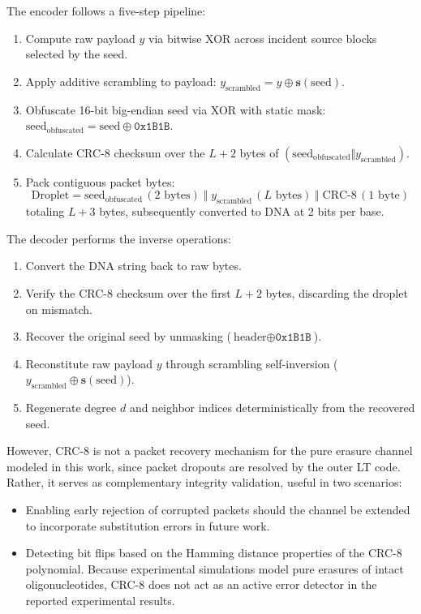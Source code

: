 The encoder follows a five-step pipeline:
\begin{enumerate}
    \item Compute raw payload $y$ via bitwise XOR across incident source blocks selected by the seed.
    \item Apply additive scrambling to payload: $y_{\text{scrambled}} = y \oplus \mathbf{s}(\text{seed})$.
    \item Obfuscate 16-bit big-endian seed via XOR with static mask: $\text{seed}_{\text{obfuscated}} = \text{seed} \oplus \texttt{0x1B1B}$.
    \item Calculate CRC-8 checksum over the $L + 2$ bytes of $(\text{seed}_{\text{obfuscated}} \Vert y_{\text{scrambled}})$.
    \item Pack contiguous packet bytes:
    \begin{equation}
        \text{Droplet} = \text{seed}_{\text{obfuscated}} \,(2\text{ bytes}) \;\Vert\; y_{\text{scrambled}} \,(L\text{ bytes}) \;\Vert\; \text{CRC-8} \,(1\text{ byte})
    \end{equation}
    totaling $L + 3$ bytes, subsequently converted to DNA at 2 bits per base.
\end{enumerate}

The decoder performs the inverse operations:
\begin{enumerate}
    \item Convert the DNA string back to raw bytes.
    \item Verify the CRC-8 checksum over the first $L + 2$ bytes, discarding the droplet on mismatch.
    \item Recover the original seed by unmasking ($\text{header} \oplus \texttt{0x1B1B}$).
    \item Reconstitute raw payload $y$ through scrambling self-inversion ($y_{\text{scrambled}} \oplus \mathbf{s}(\text{seed})$).
    \item Regenerate degree $d$ and neighbor indices deterministically from the recovered seed.
\end{enumerate}

However, CRC-8 is not a packet recovery mechanism for the pure erasure channel modeled in this work, since packet dropouts are resolved by the outer LT code. Rather, it serves as complementary integrity validation, useful in two scenarios:
\begin{itemize}
    \item Enabling early rejection of corrupted packets should the channel be extended to incorporate substitution errors in future work.
    \item Detecting bit flips based on the Hamming distance properties of the CRC-8 polynomial. Because experimental simulations model pure erasures of intact oligonucleotides, CRC-8 does not act as an active error detector in the reported experimental results.
\end{itemize}

